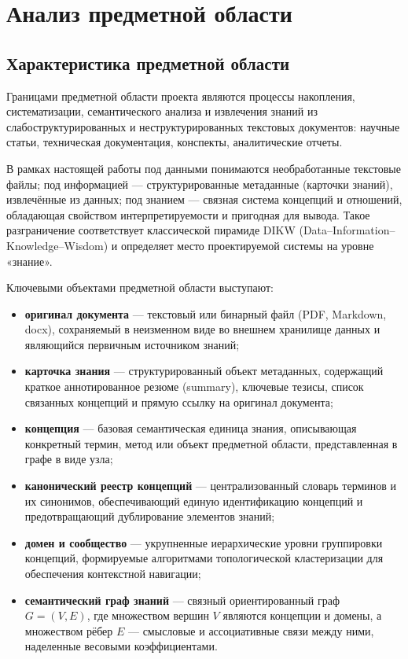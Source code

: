 \section{Анализ предметной области}

\subsection{Характеристика предметной области}
Границами предметной области проекта являются процессы накопления, систематизации, семантического анализа и извлечения знаний из слабоструктурированных и неструктурированных текстовых документов: научные статьи, техническая документация, конспекты, аналитические отчеты. 

В рамках настоящей работы под данными понимаются необработанные текстовые файлы; под информацией — структурированные метаданные (карточки знаний), извлечённые из данных; под знанием — связная система концепций и отношений, обладающая свойством интерпретируемости и пригодная для вывода. Такое разграничение соответствует классической пирамиде DIKW (Data–Information–Knowledge–Wisdom) и определяет место проектируемой системы на уровне «знание».

Ключевыми объектами предметной области выступают:
\begin{itemize}
    \item \textbf{оригинал документа} --- текстовый или бинарный файл (PDF, Markdown, docx), сохраняемый в неизменном виде во внешнем хранилище данных и являющийся первичным источником знаний;
    \item \textbf{карточка знания} --- структурированный объект метаданных, содержащий краткое аннотированное резюме (summary), ключевые тезисы, список связанных концепций и прямую ссылку на оригинал документа;
    \item \textbf{концепция} --- базовая семантическая единица знания, описывающая конкретный термин, метод или объект предметной области, представленная в графе в виде узла;
    \item \textbf{канонический реестр концепций} --- централизованный словарь терминов и их синонимов, обеспечивающий единую идентификацию концепций и предотвращающий дублирование элементов знаний;
    \item \textbf{домен и сообщество} --- укрупненные иерархические уровни группировки концепций, формируемые алгоритмами топологической кластеризации для обеспечения контекстной навигации;
    \item \textbf{семантический граф знаний} --- связный ориентированный граф $G = (V, E)$, где множеством вершин $V$ являются концепции и домены, а множеством рёбер $E$ --- смысловые и ассоциативные связи между ними, наделенные весовыми коэффициентами.
\end{itemize}


